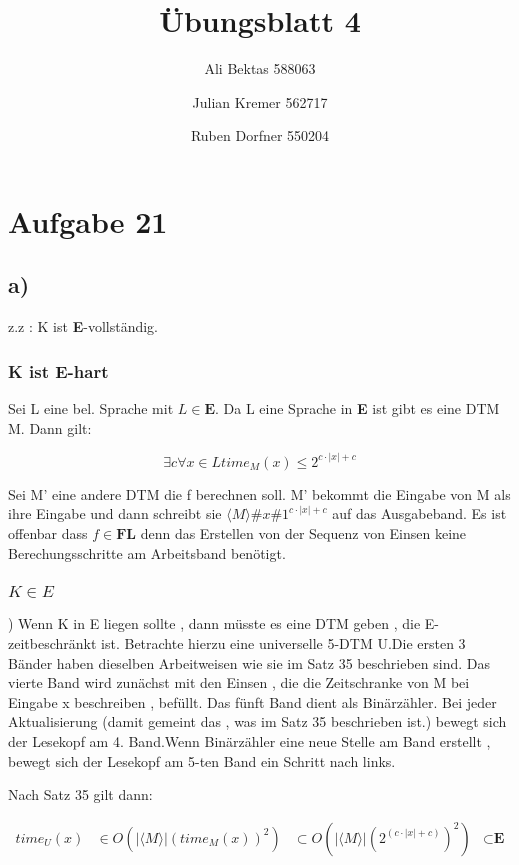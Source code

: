 \documentclass{article}
\title{Übungsblatt 4}
\author{Ali Bektas 588063 \and Julian Kremer 562717 \and Ruben Dorfner 550204}
\begin{document}
	

	\maketitle

	
	\section*{Aufgabe 21}
		\subsection*{a)}
			z.z : K ist \textbf{E}-vollständig.

			\subsubsection*{K ist E-hart}
				Sei L eine bel. Sprache mit $L \in \textbf{E}$. Da L eine Sprache in \textbf{E} ist gibt es eine DTM M. Dann gilt: 

					\[
						\exists c \forall x \in L time_M(x) \leq 2^{c \cdot |x| + c}
					\]

				Sei M' eine andere DTM die f berechnen soll. M' bekommt die Eingabe von M als ihre Eingabe und dann schreibt sie $\langle M \rangle \# x \# 1^{c \cdot |x| + c}$ auf das Ausgabeband. Es ist offenbar dass $f \in \textbf{FL}$ denn das Erstellen von der Sequenz von Einsen keine Berechungsschritte am Arbeitsband benötigt. 

			\subsubsection*{$K \in E$ })
				Wenn K in E liegen sollte , dann müsste es eine DTM geben , die E-zeitbeschränkt ist. 
				Betrachte hierzu eine universelle 5-DTM U.Die ersten 3 Bänder haben dieselben Arbeitweisen wie sie im Satz 35 beschrieben sind. Das vierte Band wird zunächst mit den Einsen  , die die Zeitschranke von M bei Eingabe x beschreiben , befüllt. Das fünft Band dient als Binärzähler. 
				Bei jeder Aktualisierung (damit gemeint das , was im Satz 35 beschrieben ist.) bewegt sich der Lesekopf am 4. Band.Wenn Binärzähler eine neue Stelle am Band erstellt , bewegt sich der Lesekopf am 5-ten Band ein Schritt nach links.

				Nach Satz 35 gilt dann:
				
				\begin{align*}
					time_U(x) &\in 
					O(| \langle M \rangle | (time_M(x))^2) &\subset
					O(| \langle M \rangle | (2^(c \cdot |x| + c))^2) &\subset
					\textbf{E}
				\end{align*} 
\end{document}
